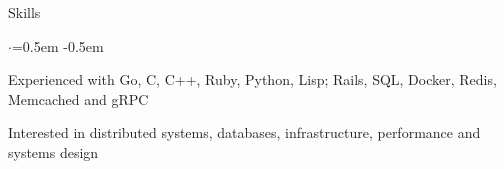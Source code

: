 \documentclass{resume} %
\begin{document}

\begin{rSection}{Skills}
  \vspace {0.2em}
  \begin{list}{$\cdot$}{\leftmargin=0.5em}
    \itemsep -0.5em \vspace{-0.3em}
    \item Experienced with Go, C, C++, Ruby, Python, Lisp; Rails, SQL, Docker, Redis,
      Memcached and gRPC
    \item Interested in distributed systems, databases, infrastructure,
      performance and systems design
  \end{list}
  \vspace{0.1em}
\end{rSection}


\end{document}
